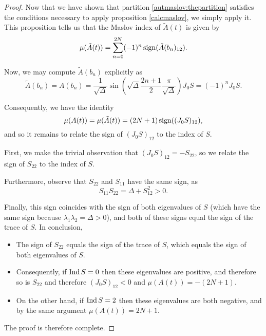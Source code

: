 \begin{proof}
Now that we have shown that partition \eqref{autmaslov:thepartition} satisfies the conditions necessary to apply proposition \ref{calcmaslov}, we simply apply it. This proposition tells us that the Maslov index of $\tilde A(t)$ is given by
\begin{equation}
\mu(\tilde A(t)) = \sum_{n = 0}^{2N} (-1)^n \operatorname{sign}(\tilde A(b_n)_{12}).
\end{equation}

Now, we may compute $\tilde A(b_n)$ explicitly as
\begin{equation}
\tilde A(b_n) = A(b_n) = \frac1{\sqrt\Delta} \sin\left( \sqrt\Delta \frac{2n + 1}2 \frac\pi{\sqrt\Delta} \right) J_0 S = (-1)^n J_0 S.
\end{equation}

Consequently, we have the identity
\begin{equation}
\mu(A(t)) = \mu(\tilde A(t)) = (2N+1) \operatorname{sign}((J_0 S)_{12}),
\end{equation}
and so it remains to relate the sign of $(J_0 S)_{12}$ to the index of $S$.

First, we make the trivial observation that $(J_0 S)_{12} = - S_{22}$, so we relate the sign of $S_{22}$ to the index of $S$.

Furthermore, observe that $S_{22}$ and $S_{11}$ have the same sign, as
\begin{equation}
S_{11} S_{22} = \Delta + S_{12}^2 > 0.
\end{equation}

Finally, this sign coincides with the sign of both eigenvalues of $S$ (which have the same sign because $\lambda_1 \lambda_2 = \Delta > 0$), and both of these signs equal the sign of the trace of $S$. In conclusion,
\begin{itemize}
\item The sign of $S_{22}$ equals the sign of the trace of $S$, which equals the sign of both eigenvalues of $S$.
\item Consequently, if $\operatorname{Ind} S = 0$ then these eigenvalues are positive, and therefore so is $S_{22}$ and therefore $(J_0 S)_{12} < 0$ and $\mu(A(t)) = -(2N+1)$.
\item On the other hand, if $\operatorname{Ind} S = 2$ then these eigenvalues are both negative, and by the same argument $\mu(A(t)) = 2N+1$.
\end{itemize}

The proof is therefore complete.
\end{proof}


